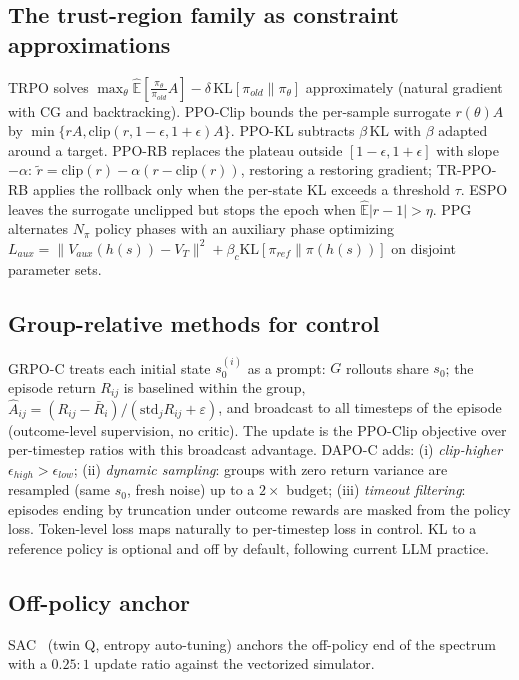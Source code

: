 \documentclass[journal,twoside]{IEEEtran}
\newcommand{\ppo}{\textsc{PPO}}
\newcommand{\trpo}{\textsc{TRPO}}
\newcommand{\grpo}{\textsc{GRPO-C}}
\newcommand{\dapo}{\textsc{DAPO-C}}
\begin{document}
\subsection{The trust-region family as constraint approximations}
\trpo{} solves $\max_\theta \hat{\mathbb{E}}[\tfrac{\pi_\theta}{\pi_{old}}A]
-\delta\,\mathrm{KL}[\pi_{old}\|\pi_\theta]$ approximately
(natural gradient with CG and backtracking).
\ppo{}-Clip bounds the per-sample surrogate
$r(\theta)A$ by $\min\{rA, \mathrm{clip}(r,1\!-\!\epsilon,1\!+\!\epsilon)A\}$.
\ppo{}-KL subtracts $\beta\,\mathrm{KL}$ with $\beta$ adapted around a
target. \ppo{}-RB replaces the plateau outside
$[1\!-\!\epsilon,1\!+\!\epsilon]$ with slope $-\alpha$:
$\tilde r = \mathrm{clip}(r) - \alpha(r-\mathrm{clip}(r))$, restoring a
restoring gradient; TR-\ppo{}-RB applies the rollback only when the
per-state KL exceeds a threshold $\tau$.
ESPO leaves the surrogate unclipped but stops the epoch when
$\hat{\mathbb{E}}|r-1|>\eta$. PPG alternates $N_\pi$ policy phases with an
auxiliary phase optimizing
$L_{aux}=\|V_{aux}(h(s))-V_T\|^2+\beta_c\mathrm{KL}[\pi_{ref}\|\pi(h(s))]$
on disjoint parameter sets.

\subsection{Group-relative methods for control}
\grpo{} treats each initial state $s_0^{(i)}$ as a prompt: $G$ rollouts
share $s_0$; the episode return $R_{ij}$ is baselined within the group,
$\hat A_{ij}=(R_{ij}-\bar R_i)/(\mathrm{std}_j R_{ij}+\varepsilon)$, and
broadcast to all timesteps of the episode (outcome-level supervision, no
critic). The update is the \ppo{}-Clip objective over per-timestep ratios
with this broadcast advantage. \dapo{} adds: (i) \emph{clip-higher}
$\epsilon_{high}>\epsilon_{low}$; (ii) \emph{dynamic sampling}: groups with
zero return variance are resampled (same $s_0$, fresh noise) up to a $2\times$
budget; (iii) \emph{timeout filtering}: episodes ending by truncation under
outcome rewards are masked from the policy loss. Token-level loss maps
naturally to per-timestep loss in control. KL to a reference policy is
optional and off by default, following current LLM practice.

\subsection{Off-policy anchor}
SAC~\cite{haarnoja2018sac} (twin Q, entropy auto-tuning) anchors the
off-policy end of the spectrum with a $0.25{:}1$ update ratio against the
vectorized simulator.
\end{document}
